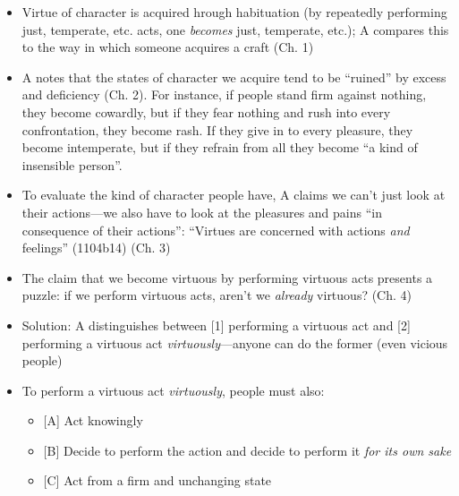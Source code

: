 \documentclass[oneside]{article}
\begin{document}
\begin{itemize}
\item Virtue of character is acquired hrough habituation (by repeatedly performing just, temperate, etc. acts, one \emph{becomes} just, temperate, etc.); A compares this to the way in which someone acquires a craft (Ch. 1)
\item A notes that the states of character we acquire tend to be ``ruined'' by excess and deficiency (Ch. 2). For instance, if people stand firm against nothing, they  become cowardly, but if they fear nothing and rush into every confrontation, they become rash. If they give in to every pleasure, they become intemperate, but if they refrain from all they become ``a kind of insensible person''.

\item To evaluate the kind of character people have, A claims we can't just look at their actions---we also have to look at the pleasures and pains ``in consequence of their actions'': ``Virtues are concerned with actions \emph{and} feelings'' (1104b14) (Ch. 3)

\item The claim that we become virtuous by performing virtuous acts presents a puzzle: if we perform virtuous acts, aren't we \emph{already} virtuous? (Ch. 4)
\item Solution:  A distinguishes between [1] performing a virtuous act and [2] performing a virtuous act \emph{virtuously}---anyone can do the former (even vicious people)

\item To perform a virtuous act \emph{virtuously}, people must also:
\begin{itemize}\item{[A] Act knowingly
}\item{[B] Decide to perform the action and decide to perform it \emph{for its own sake}}\item{[C] Act from a firm and unchanging state}\end{itemize}
\end{itemize}
\end{document}
